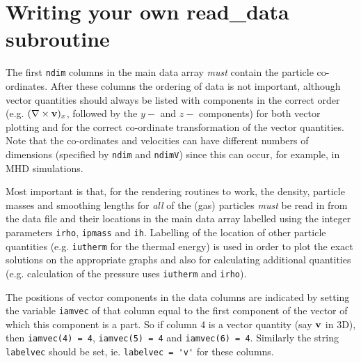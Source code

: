 \documentclass[a4paper,11pt]{article}
\begin{document}
\newpage

\section{Writing your own read\_data subroutine}
\label{sec:writeyourown}
The first \verb+ndim+ columns in the main data array \emph{must} contain the particle co-ordinates.
After these columns the ordering of data is not important, although vector quantities should
always be listed with components in the correct order (e.g. $(\nabla\times {\bf v})_x$,
followed by the $y-$ and $z-$ components) for both vector plotting and for the
correct co-ordinate transformation of the vector quantities. Note that the co-ordinates and velocities can have different
numbers of dimensions (specified by \verb+ndim+ and \verb+ndimV+) since this can occur, for example, in MHD simulations.

Most important is that, for the rendering routines to work, the density, particle
masses and smoothing lengths for \emph{all} of the (gas) particles \emph{must} be read in from
the data file and their locations in the main data array labelled using the integer
parameters \verb+irho+, \verb+ipmass+ and \verb+ih+. Labelling of the location of other particle
quantities (e.g. \verb+iutherm+ for the thermal energy) is used in
order to plot the exact solutions on the appropriate graphs and also for calculating
additional quantities (e.g. calculation of the pressure uses \verb+iutherm+ and
\verb+irho+).

 The positions of vector components in the data columns are indicated by setting the variable \verb+iamvec+ of that
column equal to the first component of the vector of which this component is a part. So if column 4
is a vector quantity (say ${\bf v}$ in 3D), then \verb+iamvec(4) = 4+, \verb+iamvec(5) = 4+ and
\verb+iamvec(6) = 4+. Similarly the string \verb+labelvec+ should be set, ie. \verb+labelvec = 'v'+ for these columns.



\end{document}
